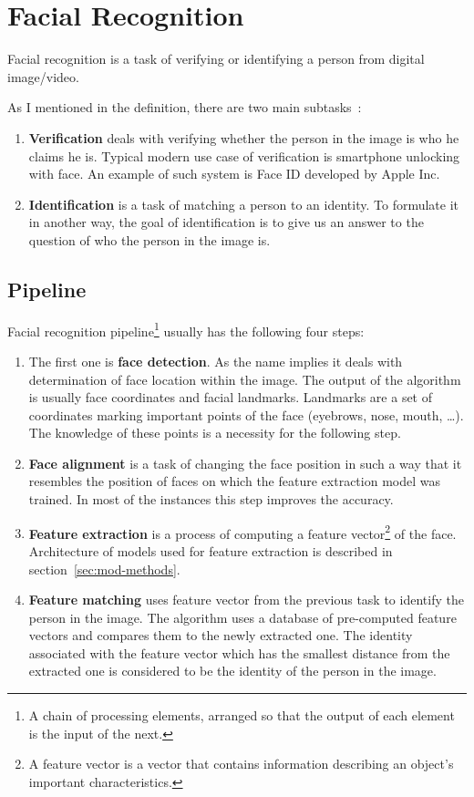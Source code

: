 \chapter{Facial Recognition}\label{ch:face-rec}
Facial recognition is a task of verifying or identifying a person from digital image/video.

As I mentioned in the definition, there are two main subtasks~\cite{FaceRec}:
\begin{enumerate}
    \item \textbf{Verification} deals with verifying whether the person in the image is who he claims he is.
    Typical modern use case of verification is smartphone unlocking with face.
    An example of such system is Face ID developed by Apple Inc.

    \item \textbf{Identification} is a task of matching a person to an identity.
    To formulate it in another way, the goal of identification is to give us an answer to the question of who the person
    in the image is.
\end{enumerate}

\section{Pipeline}\label{sec:pipeline}

Facial recognition pipeline\footnote{\label{foot:pipe}A chain of processing elements, arranged so that the output of
each element is the input of the next.} usually has the following four steps:
\begin{enumerate}
    \item The first one is \textbf{face detection}.
    As the name implies it deals with determination of face location within the image.
    The output of the algorithm is usually face coordinates and facial landmarks.
    Landmarks are a set of coordinates marking important points of the face (eyebrows, nose, mouth, \ldots).
    The knowledge of these points is a necessity for the following step.
    \item \textbf{Face alignment} is a task of changing the face position in such a way that it resembles the position
    of faces on which the feature extraction model was trained.
    In most of the instances this step improves the accuracy.
    \item \textbf{Feature extraction} is a process of computing a feature vector\footnote{A feature vector is a vector
    that contains information describing an object's important characteristics.} of the face.
    Architecture of models used for feature extraction is described in section~\ref{sec:mod-methods}.
    \item \textbf{Feature matching} uses feature vector from the previous task to identify the person in the image.
    The algorithm uses a database of pre-computed feature vectors and compares them to the newly extracted one.
    The identity associated with the feature vector which has the smallest distance from the extracted one is
    considered to be the identity of the person in the image.
\end{enumerate}

